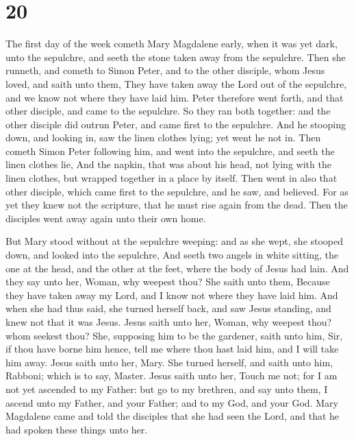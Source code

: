 \hypertarget{section-19}{%
\section{20}\label{section-19}}

 The first day of the week cometh Mary Magdalene early,
when it was yet dark, unto the sepulchre, and seeth the stone taken away
from the sepulchre.  Then she runneth, and cometh to Simon
Peter, and to the other disciple, whom Jesus loved, and saith unto them,
They have taken away the Lord out of the sepulchre, and we know not
where they have laid him.  Peter therefore went forth, and
that other disciple, and came to the sepulchre.  So they
ran both together: and the other disciple did outrun Peter, and came
first to the sepulchre.  And he stooping down, and looking
in, saw the linen clothes lying; yet went he not in.  Then
cometh Simon Peter following him, and went into the sepulchre, and seeth
the linen clothes lie,  And the napkin, that was about his
head, not lying with the linen clothes, but wrapped together in a place
by itself.  Then went in also that other disciple, which
came first to the sepulchre, and he saw, and believed. 
For as yet they knew not the scripture, that he must rise again from the
dead.  Then the disciples went away again unto their own
home.

 But Mary stood without at the sepulchre weeping: and as
she wept, she stooped down, and looked into the sepulchre,
 And seeth two angels in white sitting, the one at the
head, and the other at the feet, where the body of Jesus had lain.
 And they say unto her, Woman, why weepest thou? She
saith unto them, Because they have taken away my Lord, and I know not
where they have laid him.  And when she had thus said,
she turned herself back, and saw Jesus standing, and knew not that it
was Jesus.  Jesus saith unto her, Woman, why weepest
thou? whom seekest thou? She, supposing him to be the gardener, saith
unto him, Sir, if thou have borne him hence, tell me where thou hast
laid him, and I will take him away.  Jesus saith unto
her, Mary. She turned herself, and saith unto him, Rabboni; which is to
say, Master.  Jesus saith unto her, Touch me not; for I
am not yet ascended to my Father: but go to my brethren, and say unto
them, I ascend unto my Father, and your Father; and to my God, and your
God.  Mary Magdalene came and told the disciples that she
had seen the Lord, and that he had spoken these things unto her.

